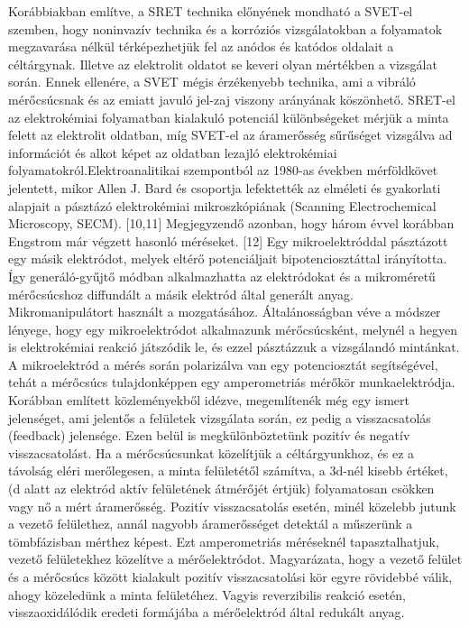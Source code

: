 Korábbiakban említve, a SRET technika előnyének mondható a SVET-el szemben, hogy noninvazív technika és a korróziós vizsgálatokban a folyamatok megzavarása nélkül térképezhetjük fel az anódos és katódos oldalait a céltárgynak. Illetve az elektrolit oldatot se keveri olyan mértékben a vizsgálat során. Ennek ellenére, a SVET mégis érzékenyebb technika, ami a vibráló mérőcsúcsnak és az emiatt javuló jel-zaj viszony arányának köszönhető. SRET-el az elektrokémiai folyamatban kialakuló potenciál különbségeket mérjük a minta felett az elektrolit oldatban, míg SVET-el az áramerősség sűrűséget vizsgálva ad információt és alkot képet az oldatban lezajló elektrokémiai folyamatokról.Elektroanalitikai szempontból az 1980-as években mérföldkövet jelentett, mikor Allen J. Bard és csoportja lefektették az elméleti és gyakorlati alapjait a pásztázó elektrokémiai mikroszkópiának (Scanning Electrochemical Microscopy, SECM). [10,11] Megjegyzendő azonban, hogy három évvel korábban Engstrom már végzett hasonló méréseket. [12] Egy mikroelektróddal pásztázott egy másik elektródot, melyek eltérő potenciáljait bipotenciosztáttal irányította. Így generáló-gyűjtő módban alkalmazhatta az elektródokat és a mikroméretű mérőcsúcshoz diffundált a másik elektród által generált anyag. Mikromanipulátort használt a mozgatásához. Általánosságban véve a módszer lényege, hogy egy mikroelektródot alkalmazunk mérőcsúcsként, melynél a hegyen is elektrokémiai reakció játszódik le, és ezzel pásztázzuk a vizsgálandó mintánkat. A mikroelektród a mérés során polarizálva van egy potenciosztát segítségével, tehát a mérőcsúcs tulajdonképpen egy amperometriás mérőkör munkaelektródja. 
Korábban említett közleményekből idézve, megemlítenék még egy ismert jelenséget, ami jelentős a felületek vizsgálata során, ez pedig a visszacsatolás (feedback) jelensége. Ezen belül is megkülönböztetünk pozitív és negatív visszacsatolást. Ha a mérőcsúcsunkat közelítjük a céltárgyunkhoz, és ez a távolság eléri merőlegesen, a minta felületétől számítva, a 3d-nél kisebb értéket, (d alatt az elektród aktív felületének átmérőjét értjük) folyamatosan csökken vagy nő a mért áramerősség. 
Pozitív visszacsatolás esetén, minél közelebb jutunk a vezető felülethez, annál nagyobb áramerősséget detektál a műszerünk a tömbfázisban mérthez képest. Ezt amperometriás méréseknél tapasztalhatjuk, vezető felületekhez közelítve a mérőelektródot. Magyarázata, hogy a vezető felület és a mérőcsúcs között kialakult pozitív visszacsatolási kör egyre rövidebbé válik, ahogy közeledünk a minta felületéhez. Vagyis reverzibilis reakció esetén, visszaoxidálódik eredeti formájába a mérőelektród által redukált anyag. 
